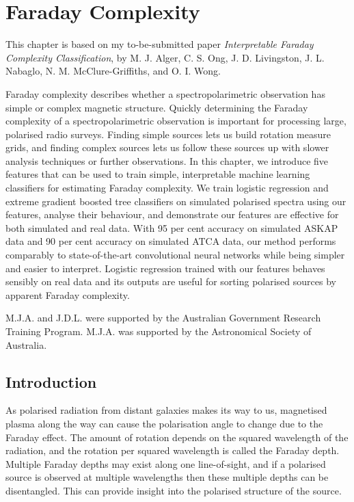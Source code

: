 \chapter{Faraday Complexity}
\label{cha:faraday-faraday}

This chapter is based on my to-be-submitted paper \emph{Interpretable Faraday Complexity Classification}, by M. J. Alger, C. S. Ong, J. D. Livingston, J. L. Nabaglo, N. M. McClure-Griffiths, and O. I. Wong.

  Faraday complexity describes whether a spectropolarimetric observation has simple or complex magnetic structure. Quickly determining the Faraday complexity of a spectropolarimetric observation is important for processing large, polarised radio surveys. Finding simple sources lets us build rotation measure grids, and finding complex sources lets us follow these sources up with slower analysis techniques or further observations. In this chapter, we introduce five features that can be used to train simple, interpretable machine learning classifiers for estimating Faraday complexity. We train logistic regression and extreme gradient boosted tree classifiers on simulated polarised spectra using our features, analyse their behaviour, and demonstrate our features are effective for both simulated and real data. With 95 per cent accuracy on simulated ASKAP data and 90 per cent accuracy on simulated ATCA data, our method performs comparably to state-of-the-art convolutional neural networks while being simpler and easier to interpret. Logistic regression trained with our features behaves sensibly on real data and its outputs are useful for sorting polarised sources by apparent Faraday complexity.

  M.J.A. and J.D.L. were supported by the Australian Government Research Training Program. M.J.A. was supported by the Astronomical Society of Australia.

\section{Introduction}
\label{sec:faraday-intro}

  As polarised radiation from distant galaxies makes its way to us, magnetised plasma along the way can cause the polarisation angle to change due to the Faraday effect. The amount of rotation depends on the squared wavelength of the radiation, and the rotation per squared wavelength is called the Faraday depth. Multiple Faraday depths may exist along one line-of-sight, and if a polarised source is observed at multiple wavelengths then these multiple depths can be disentangled. This can provide insight into the polarised structure of the source.

